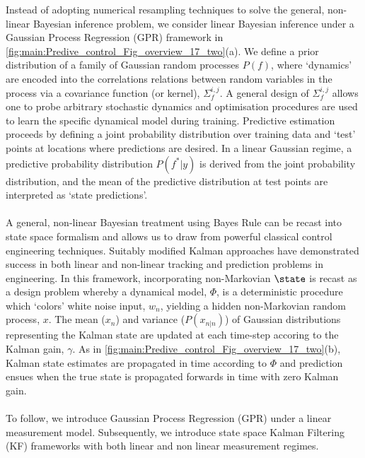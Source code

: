Instead of adopting numerical resampling techniques to solve the general, non-linear Bayesian inference problem, we consider linear Bayesian inference under a Gaussian Process Regression (GPR) framework in \cref{fig:main:Predive_control_Fig_overview_17_two}(a). We define a prior distribution of a family of Gaussian random processes $P(f)$, where `dynamics' are encoded into the correlations relations between random variables in the process via a covariance function (or kernel), $\Sigma_f^{i, j} $.  A general design of $\Sigma_f^{i, j}$ allows one to probe arbitrary stochastic dynamics and optimisation procedures are used to learn the specific dynamical model during training.  Predictive estimation proceeds by defining a joint probability distribution over training data and `test' points at locations where predictions are desired. In a linear Gaussian regime, a predictive probability distribution $P(f^*|y)$ is derived from the joint probability distribution, and the mean of the predictive distribution at test points are interpreted as `state predictions'.
\\
\\
A general, non-linear Bayesian treatment using Bayes Rule can be recast into state space formalism and allows us to draw from powerful classical control engineering techniques. Suitably modified Kalman approaches have demonstrated success in both linear and non-linear tracking and prediction problems in engineering. In this framework, incorporating non-Markovian $\state$ is recast as a design problem whereby a dynamical model, $\Phi$, is a deterministic procedure which `colors' white noise input, $w_n$, yielding a hidden non-Markovian random process, $x$.  The mean ($x_n$) and variance ($P(x_{n|n})$) of Gaussian distributions representing the Kalman state are updated at each time-step accoring to the Kalman gain, $\gamma$. As in \cref{fig:main:Predive_control_Fig_overview_17_two}(b), Kalman state estimates are propagated in time according to $\Phi$  and prediction ensues when the true state is propagated forwards in time with zero Kalman gain.  
\\
\\
To follow, we introduce Gaussian Process Regression (GPR) under a linear measurement model. Subsequently, we introduce state space Kalman Filtering (KF) frameworks with both linear and non linear measurement regimes.

